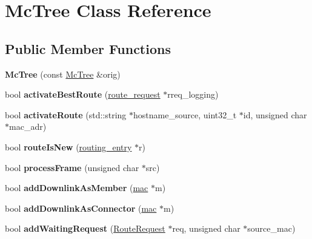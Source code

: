\hypertarget{classMcTree}{\section{Mc\-Tree Class Reference}
\label{classMcTree}
}
\subsection*{Public Member Functions}
\begin{DoxyCompactItemize}
\item 
\hypertarget{classMcTree_ae6e7ec5f80ed5cabcfe6383dfd77fdcd}{{\bfseries Mc\-Tree} (const \hyperlink{classMcTree}{Mc\-Tree} \&orig)}\label{classMcTree_ae6e7ec5f80ed5cabcfe6383dfd77fdcd}

\item 
\hypertarget{classMcTree_a44a8bca5229a33b3956f02b698d8d4e4}{bool {\bfseries activate\-Best\-Route} (\hyperlink{structroute__request}{route\-\_\-request} $\ast$rreq\-\_\-logging)}\label{classMcTree_a44a8bca5229a33b3956f02b698d8d4e4}

\item 
\hypertarget{classMcTree_ae90b832fbebc0acf66556f2d0e2adb84}{bool {\bfseries activate\-Route} (std\-::string $\ast$hostname\-\_\-source, uint32\-\_\-t $\ast$id, unsigned char $\ast$mac\-\_\-adr)}\label{classMcTree_ae90b832fbebc0acf66556f2d0e2adb84}

\item 
\hypertarget{classMcTree_a609138636cf6f77d902d571e28c07d88}{bool {\bfseries route\-Is\-New} (\hyperlink{structrouting__entry}{routing\-\_\-entry} $\ast$r)}\label{classMcTree_a609138636cf6f77d902d571e28c07d88}

\item 
\hypertarget{classMcTree_a74b698d094e8c2965f39bbf02d417329}{bool {\bfseries process\-Frame} (unsigned char $\ast$src)}\label{classMcTree_a74b698d094e8c2965f39bbf02d417329}

\item 
\hypertarget{classMcTree_ab374ea31c27bb6441ffd24650d52542f}{bool {\bfseries add\-Downlink\-As\-Member} (\hyperlink{structmac}{mac} $\ast$m)}\label{classMcTree_ab374ea31c27bb6441ffd24650d52542f}

\item 
\hypertarget{classMcTree_ab1203d62a3530db8d38cbcf83cdaff7f}{bool {\bfseries add\-Downlink\-As\-Connector} (\hyperlink{structmac}{mac} $\ast$m)}\label{classMcTree_ab1203d62a3530db8d38cbcf83cdaff7f}

\item 
\hypertarget{classMcTree_a2a683aa8a1cdab2f3d28046608f49694}{bool {\bfseries add\-Waiting\-Request} (\hyperlink{classRouteRequest}{Route\-Request} $\ast$req, unsigned char $\ast$source\-\_\-mac)}\label{classMcTree_a2a683aa8a1cdab2f3d28046608f49694}


\end{DoxyCompactItemize}
